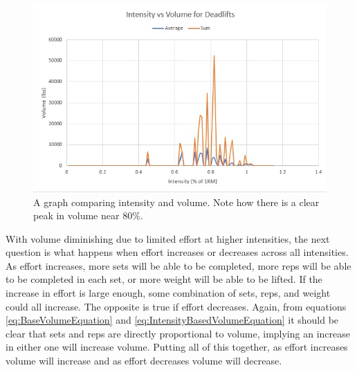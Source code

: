 \begin{figure}
    \centering
    \includegraphics[scale=1.6]{graphs/IntensityVsVolumeGraph.jpg}
    \caption{A graph comparing intensity and volume. Note how there is a clear peak in volume near $80\%$.}
    \label{fig:IntensityVsVolumeGraph}
\end{figure}

With volume diminishing due to limited effort at higher intensities, the next question is what happens when effort increases or decreases across all intensities. As effort increases, more sets will be able to be completed, more reps will be able to be completed in each set, or more weight will be able to be lifted. If the increase in effort is large enough, some combination of sets, reps, and weight could all increase. The opposite is true if effort decreases. Again, from equations \ref{eq:BaseVolumeEquation} and \ref{eq:IntensityBasedVolumeEquation} it should be clear that sets and reps are directly proportional to volume, implying an increase in either one will increase volume. Putting all of this together, as effort increases volume will increase and as effort decreases volume will decrease.

